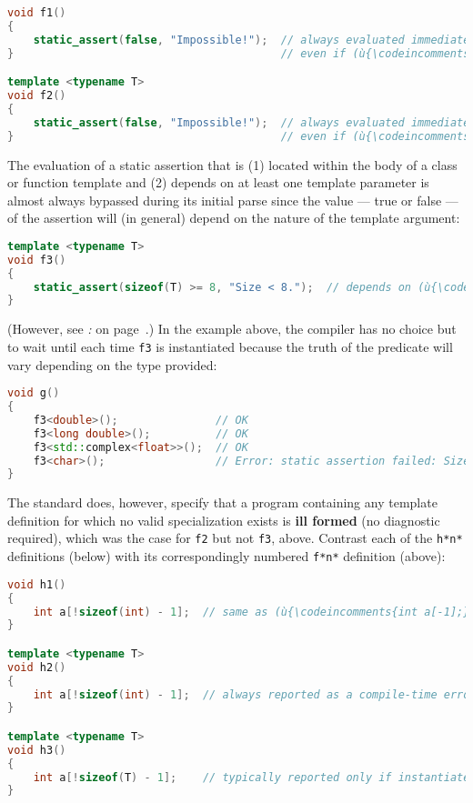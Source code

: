\begin{lstlisting}[language=C++]
void f1()
{
    static_assert(false, "Impossible!");  // always evaluated immediately...
}                                         // even if (ù{\codeincomments{f1()}}ù) is never invoked

template <typename T>
void f2()
{
    static_assert(false, "Impossible!");  // always evaluated immediately...
}                                         // even if (ù{\codeincomments{f2()}}ù) is never instantiated
\end{lstlisting}
    
\noindent The evaluation of a static assertion that is (1) located within the
body of a class or function template and (2) depends on at least one
template parameter is almost always bypassed during its initial parse since
the value --- true or false --- of the assertion will (in general) depend on the nature
of the template argument:

\begin{lstlisting}[language=C++]
template <typename T>
void f3()
{
    static_assert(sizeof(T) >= 8, "Size < 8.");  // depends on (ù{\codeincomments{T}}ù)
}
\end{lstlisting}
    
\noindent (However, see {\it{}: } on page~\pageref{static-potential-pitfalls}.) In the example above, the compiler has no choice but to wait until each
time \texttt{f3} is instantiated because the truth of the predicate will
vary depending on the type provided:

\begin{lstlisting}[language=C++]
void g()
{
    f3<double>();               // OK
    f3<long double>();          // OK
    f3<std::complex<float>>();  // OK
    f3<char>();                 // Error: static assertion failed: Size < 8.
}
\end{lstlisting}
    
\noindent The standard does, however, specify that a program containing any
template definition for which no valid specialization exists is
\textbf{ill formed} (no diagnostic required), which was the case for
\texttt{f2} but not \texttt{f3}, above. Contrast each of the
\texttt{h*n*} definitions (below) with its correspondingly numbered
\texttt{f*n*} definition (above):

\begin{lstlisting}[language=C++]
void h1()
{
    int a[!sizeof(int) - 1];  // same as (ù{\codeincomments{int a[-1];}}ù) and is ill formed
}

template <typename T>
void h2()
{
    int a[!sizeof(int) - 1];  // always reported as a compile-time error
}

template <typename T>
void h3()
{
    int a[!sizeof(T) - 1];    // typically reported only if instantiated
}
\end{lstlisting}
    
